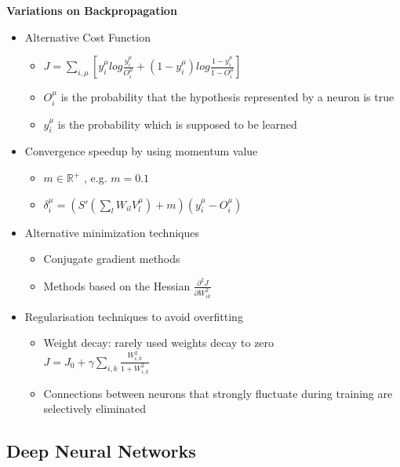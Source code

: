 \documentclass[main]{subfiles}
\begin{document}
\textbf{Variations on Backpropagation}
\begin{itemize}
\item Alternative Cost Function \begin{itemize}[label={$\circ$}]
\item $J=\sum_{i,\mu}[y^{\mu}_ilog\frac{y_i^{\mu}}{O_i^{\mu}}+(1-y_i^{\mu})log\frac{1-y_i^{\mu}}{1-O_i^{\mu}}]$
\item $O_i^{\mu}$ is the probability that the hypothesis represented by a neuron is true
\item $y_i^{\mu}$ is the probability which is supposed to be learned
\end{itemize}
\item Convergence speedup by using momentum value \begin{itemize}[label={$\circ$}]\item $m \in \mathbb{R}^+$ , e.g. $m = 0.1$ \item
$\delta_i^{\mu}=(S'(\sum_lW_{il}V_l^{\mu})+m)(y_i^{\mu}-O_i^{\mu})$\end{itemize}
\item Alternative minimization techniques \begin{itemize}[label={$\circ$}]
\item Conjugate gradient methods
\item Methods based on the Hessian $\frac{\partial^2J}{\partial W^2_{ik}}$
\end{itemize}
\item Regularisation techniques to avoid overfitting
\begin{itemize}[label={$\circ$}]
\item Weight decay: rarely used weights decay to zero \\$J=J_0+\gamma\sum_{i,k}\frac{W_{i,k}^2}{1+W_{i,k}^2}$
\item Connections between neurons that strongly fluctuate during training are selectively eliminated
\end{itemize}

\end{itemize}

\subsection{Deep Neural Networks}
\end{document}
